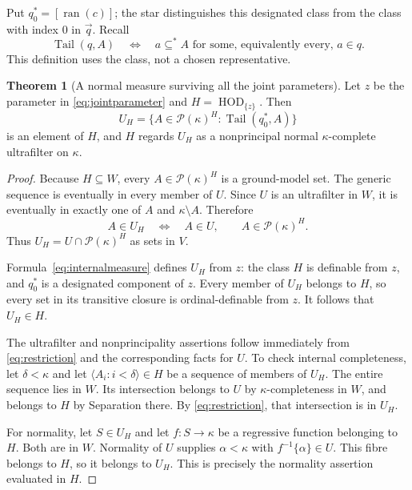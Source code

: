 \documentclass[11pt,letterpaper]{article}
\theoremstyle{definition}
\newtheorem{theorem}[definition]{Theorem}
\numberwithin{equation}{section}
\newcommand{\Pow}{\mathcal P}
\newcommand{\HD}[1]{\operatorname{HOD}_{\{#1\}}}
\newcommand{\Tail}{\operatorname{Tail}}
\begin{document}
Put $q_0^*=[\operatorname{ran}(c)]$; the star distinguishes this designated class from the class with index $0$ in $\vec q$. Recall
\[
 \Tail(q,A)\quad\Longleftrightarrow\quad
 a\subseteq^* A\text{ for some, equivalently every, }a\in q.
\]
This definition uses the class, not a chosen representative.

\begin{theorem}[A normal measure surviving all the joint parameters]\label{thm:normal}
Let $z$ be the parameter in \eqref{eq:jointparameter} and $H=\HD{z}$. Then
\begin{equation}\label{eq:internalmeasure}
 U_H=\{A\in\Pow(\kappa)^H:\Tail(q_0^*,A)\}
\end{equation}
is an element of $H$, and $H$ regards $U_H$ as a nonprincipal normal $\kappa$-complete ultrafilter on $\kappa$.
\end{theorem}
\begin{proof}
Because $H\subseteq W$, every $A\in\Pow(\kappa)^H$ is a ground-model set. The generic sequence is eventually in every member of $U$. Since $U$ is an ultrafilter in $W$, it is eventually in exactly one of $A$ and $\kappa\setminus A$. Therefore
\begin{equation}\label{eq:restriction}
 A\in U_H\quad\Longleftrightarrow\quad A\in U,
 \qquad A\in\Pow(\kappa)^H.
\end{equation}
Thus $U_H=U\cap\Pow(\kappa)^H$ as sets in $V$.

Formula~\eqref{eq:internalmeasure} defines $U_H$ from $z$: the class $H$ is definable from $z$, and $q_0^*$ is a designated component of $z$. Every member of $U_H$ belongs to $H$, so every set in its transitive closure is ordinal-definable from $z$. It follows that $U_H\in H$.

The ultrafilter and nonprincipality assertions follow immediately from \eqref{eq:restriction} and the corresponding facts for $U$. To check internal completeness, let $\delta<\kappa$ and let $\langle A_i:i<\delta\rangle\in H$ be a sequence of members of $U_H$. The entire sequence lies in $W$. Its intersection belongs to $U$ by $\kappa$-completeness in $W$, and belongs to $H$ by Separation there. By \eqref{eq:restriction}, that intersection is in $U_H$.

For normality, let $S\in U_H$ and let $f:S\to\kappa$ be a regressive function belonging to $H$. Both are in $W$. Normality of $U$ supplies $\alpha<\kappa$ with $f^{-1}\{\alpha\}\in U$. This fibre belongs to $H$, so it belongs to $U_H$. This is precisely the normality assertion evaluated in $H$.
\end{proof}
\end{document}
